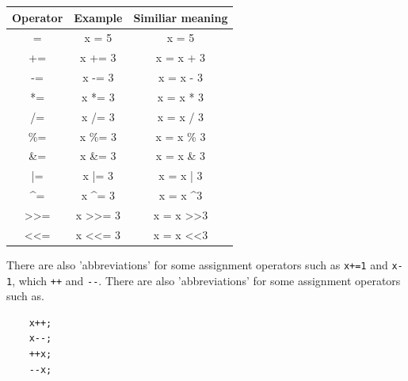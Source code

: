 \begin{center}
	\begin{tabular}{|c|c|c|}
		\hline
		\multicolumn{1}{|l|}{Operator} & \multicolumn{1}{l|}{Example}       & \multicolumn{1}{l|}{Similiar meaning}  \\ \hline
		=   & x = 5   & x = 5      \\ \hline
		+=  & x += 3  & x = x + 3  \\ \hline
		-=  & x -= 3  & x = x - 3  \\ \hline
		*=  & x *= 3  & x = x * 3  \\ \hline
		/=  & x /= 3  & x = x / 3  \\ \hline
		\%= & x \%= 3 & x = x \% 3 \\ \hline
		\&= & x \&= 3 & x = x \& 3 \\ \hline
		|=  & x |= 3  & x = x | 3  \\ \hline
		\textasciicircum{}=            & x \textasciicircum{}= 3           & x = x \textasciicircum 3           \\ \hline
		\textgreater{}\textgreater{}=  & x \textgreater{}\textgreater{}= 3 & x = x \textgreater{}\textgreater 3 \\ \hline
		\textless{}\textless{}=        & x \textless{}\textless{}= 3       & x = x \textless{}\textless 3       \\ \hline
	\end{tabular}
\end{center}
There are also 'abbreviations' for some assignment operators such as \verb*|x+=1| and \verb*|x-1|, which \verb*|++| and \verb*|--|. There are also 'abbreviations' for some assignment operators such as.
\begin{verbatim}
    x++;
    x--;
    ++x;
    --x;
\end{verbatim}

